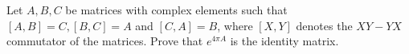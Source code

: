 Let $A,B,C$ be matrices with complex elements such that $[A,B]=C, [B,C]=A$ and $[C,A]=B$, where $[X,Y]$ denotes the $XY-YX$ commutator of the matrices. Prove that $e^{4 \pi A}$ is the identity matrix.